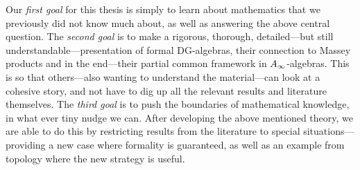 Our \textit{first goal} for this thesis is simply to learn about mathematics that we previously did not know much about, as well as answering the above central question. The \textit{second goal} is to make a rigorous, thorough, detailed---but still understandable---presentation of formal DG-algebras, their connection to Massey products and in the end---their partial common framework in $A_{\infty}$-algebras. This is so that others---also wanting to understand the material---can look at a cohesive story, and not have to dig up all the relevant results and literature themselves. The \textit{third goal} is to push the boundaries of mathematical knowledge, in what ever tiny nudge we can. After developing the above mentioned theory, we are able to do this by restricting results from the literature to special situations---providing a new case where formality is guaranteed, as well as an example from topology where the new strategy is useful. 














